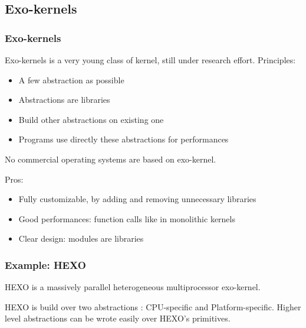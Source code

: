 %
%

\subsection{Exo-kernels}

%
%

\begin{frame}
  \frametitle{Exo-kernels}

  Exo-kernels is a very young class of kernel, still under research
  effort. Principles:

  \begin{itemize}
  \item
    A few abstraction as possible
  \item
    Abstractions are libraries
  \item
    Build other abstractions on existing one
  \item
    Programs use directly these abstractions for performances
  \end{itemize}

  \-

  No commercial operating systems are based on exo-kernel.

  \-

  Pros:

  \begin{itemize}
  \item
    Fully customizable, by adding and removing unnecessary libraries
  \item
    Good performances: function calls like in monolithic kernels
  \item
    Clear design: modules are libraries
  \end{itemize}

\end{frame}

%
%

\begin{frame}
  \frametitle{Example: HEXO}

  HEXO is a massively parallel heterogeneous multiprocessor
  exo-kernel.

  \begin{center}
  \end{center}

  HEXO is build over two abstractions : CPU-specific and
  Platform-specific. Higher level abstractions can be wrote easily
  over HEXO's primitives.

\end{frame}

